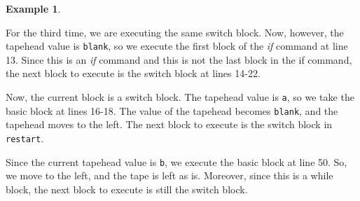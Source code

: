 \documentclass{amsart}
\theoremstyle{definition}
\newtheorem{example}[rules]{Example}
\begin{document}
\begin{example}
\begin{figure}[H]
    \end{figure}
    \noindent For the third time, we are executing the same switch block. Now, however, the tapehead value is \texttt{blank}, so we execute the first block of the \textit{if} command at line 13. Since this is an \textit{if} command and this is not the last block in the if command, the next block to execute is the switch block at lines 14-22.
    \begin{figure}[H]
        \centering
    \end{figure}
    \noindent Now, the current block is a switch block. The tapehead value is \texttt{a}, so we take the basic block at lines 16-18. The value of the tapehead becomes \texttt{blank}, and the tapehead moves to the left. The next block to execute is the switch block in \texttt{restart}.
    \begin{figure}[H]
        \centering
    \end{figure}
    \noindent Since the current tapehead value is \texttt{b}, we execute the basic block at line 50. So, we move to the left, and the tape is left as is. Moreover, since this is a while block, the next block to execute is still the switch block.
    \begin{figure}[H]
        \centering
\end{figure}
\end{example}
\end{document}
